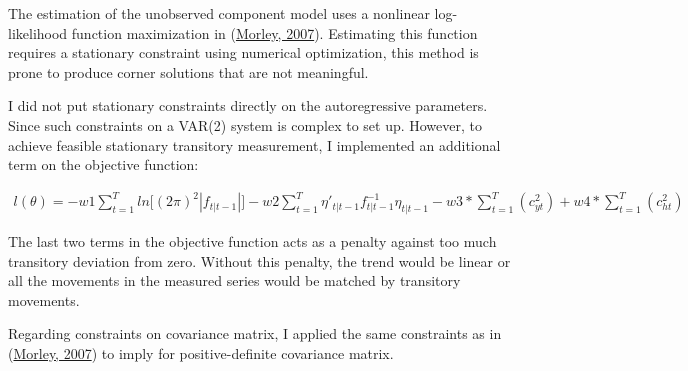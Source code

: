 \documentclass[
  12pt,
]{article}
\begin{document}
The estimation of the unobserved component model uses a nonlinear log-likelihood function maximization in (\protect\hyperlink{ref-morley_slow_2007}{Morley, 2007}). Estimating this function requires a stationary constraint using numerical optimization, this method is prone to produce corner solutions that are not meaningful.

I did not put stationary constraints directly on the autoregressive parameters. Since such constraints on a VAR(2) system is complex to set up. However, to achieve feasible stationary transitory measurement, I implemented an additional term on the objective function:

\begin{align}
l(\theta) = -w1\sum_{t=1}^{T}ln\lbrack(2\pi)^2|f_{t|t-1}|\rbrack
-w2\sum_{t=1}^{T}\eta'_{t|t-1}f^{-1}_{t|t-1}\eta_{t|t-1}
- w3*\sum_{t=1}^{T}(c_{yt}^2) + w4*\sum_{t=1}^{T}(c_{ht}^2)
\end{align}

The last two terms in the objective function acts as a penalty against too much transitory deviation from zero. Without this penalty, the trend would be linear or all the movements in the measured series would be matched by transitory movements.

Regarding constraints on covariance matrix, I applied the same constraints as in (\protect\hyperlink{ref-morley_slow_2007}{Morley, 2007}) to imply for positive-definite covariance matrix.
\end{document}
